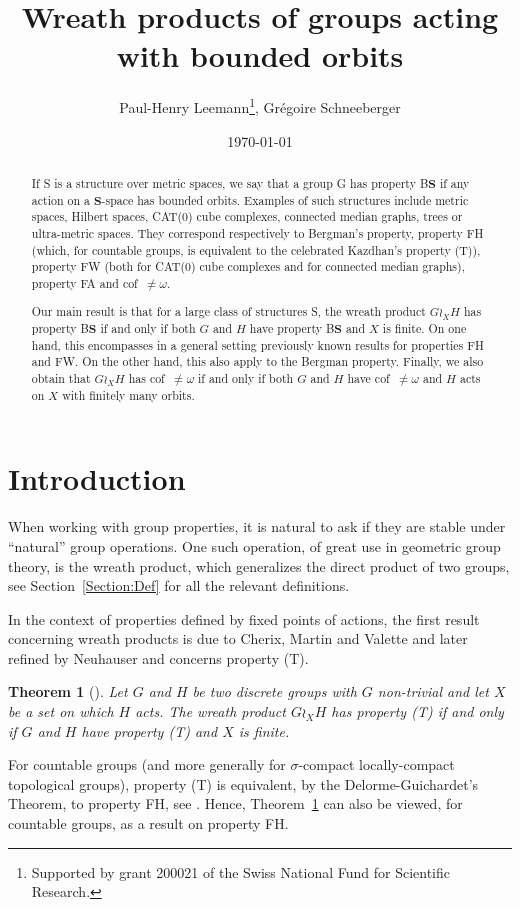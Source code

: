 \documentclass[a4paper]{article}
\title{Wreath products of groups acting with bounded orbits}
\author{Paul-Henry Leemann\thanks{Supported by grant 200021\textunderscore188578 of the Swiss National Fund for Scientific Research.}, Grégoire Schneeberger}
\date{\today \quad \currenttime}
\newtheorem{thm}[lem]{Theorem}
\theoremstyle{definition}
\newcommand*{\BS}{B$\mathbf{S}$}
\begin{document}
\maketitle
%
%
%
%
%
%
%
%
%
%
\begin{abstract}
If S is a structure over metric spaces, we say that a group G has property \BS{} if any action on a $\mathbf S$-space has bounded orbits. Examples of such structures include metric spaces, Hilbert spaces, CAT(0) cube complexes, connected median graphs, trees or ultra-metric spaces.
They correspond respectively to Bergman's property, property FH (which, for countable groups, is equivalent to the celebrated Kazdhan's property (T)), property FW (both for CAT(0) cube complexes and for connected median graphs), property FA and cof~$\neq\omega$.

Our main result is that for a large class of structures S, the wreath product $G\wr_XH$ has property \BS{} if and only if both $G$ and $H$ have property \BS{} and $X$ is finite. On one hand, this encompasses in a general setting previously known results for properties FH and FW. On the other hand, this also apply to the Bergman property.
Finally, we also obtain that $G\wr_XH$ has cof~$\neq\omega$ if and only if both $G$ and $H$ have cof~$\neq\omega$ and $H$ acts on $X$ with finitely many orbits.
\end{abstract}
%
%
%
%
%
%
%
%
%
%
%
%
%
%
%
%
%
%
%
%
%
%
%
%
%
\section{Introduction}
%
%
%
%
%
%
When working with group properties, it is natural to ask if they are stable under ``natural'' group operations. One such operation, of great use in geometric group theory, is the wreath product, which generalizes the direct product of two groups, see Section~\ref{Section:Def} for all the relevant definitions.

In the context of properties defined by fixed points of actions, the first result concerning wreath products is due to Cherix, Martin and Valette and later refined by Neuhauser and concerns property (T).
%
%
\begin{thm}[\cite{Cherix2004,Neuhauser2005a}] \label{T:Wreath_prop_T}
Let $G$ and $H$ be two discrete groups with $G$ non-trivial and let $X$ be a set on which $H$ acts. The wreath product $G \wr_X H$ has property (T) if and only if $G$ and $H$ have property (T) and $X$ is finite.
\end{thm}
%
%
For countable groups (and more generally for $\sigma$-compact locally-compact topological groups), property (T) is equivalent, by the Delorme-Guichardet's Theorem, to property FH, see \cite[Thm. 2.12.4]{Bekka2008}.
Hence, Theorem~\ref{T:Wreath_prop_T} can also be viewed, for countable groups, as a result on property FH.
\end{document}
